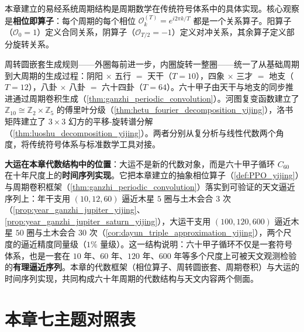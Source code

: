 \begin{remark}[与全书的统一]\label{rem:yijing_book_interface}
本章建立的易经系统周期结构是周期数学在传统符号体系中的具体实现。核心观察是\textbf{相位即算子}：每个周期的每个相位 $\mathcal{O}_k^{(T)} = e^{i2\pi k/T}$ 都是一个关系算子。阳算子（$\mathcal{O}_0 = 1$）定义合同关系，阴算子（$\mathcal{O}_{T/2} = -1$）定义对冲关系，其余算子定义部分旋转关系。

周转圆嵌套生成规则——外圈每前进一步，内圈旋转一整圈——统一了从基础周期到大周期的生成过程：阴阳 $\times$ 五行 $=$ 天干（$T=10$），四象 $\times$ 三才 $=$ 地支（$T=12$），八卦 $\times$ 八卦 $=$ 六十四卦（$T=64$）。六十甲子由天干与地支的同步推进通过周期卷积生成（\cref{thm:ganzhi_periodic_convolution}）。河图复变函数建立了 $\mathbb{Z}_{10} \cong \mathbb{Z}_2 \times \mathbb{Z}_5$ 的傅里叶分级（\cref{thm:hetu_fourier_decomposition_yijing}），洛书矩阵建立了 $3 \times 3$ 幻方的平移-旋转谱分解（\cref{thm:luoshu_decomposition_yijing}）。两者分别从复分析与线性代数两个角度，将传统符号体系与标准数学工具对接。

\textbf{大运在本章代数结构中的位置}：大运不是新的代数对象，而是六十甲子循环 $C_{60}$ 在十年尺度上的\textbf{时间序列实现}。它把本章建立的抽象相位算子（\cref{def:PPO_yijing}）与周期卷积框架（\cref{thm:ganzhi_periodic_convolution}）落实到可验证的天文逼近序列上：年干支用 $(10,12,60)$ 逼近木星 $5$ 圈与土木会合 $3$ 次（\cref{prop:year_ganzhi_jupiter_yijing}、\cref{prop:year_ganzhi_jupiter_saturn_yijing}），大运干支用 $(100,120,600)$ 逼近木星 $50$ 圈与土木会合 $30$ 次（\cref{cor:dayun_triple_approximation_yijing}），两个尺度的逼近精度同量级（$1\%$ 量级）。这一结构说明：六十甲子循环不仅是一套符号体系，也是一套在 $10$ 年、$60$ 年、$120$ 年、$600$ 年等多个尺度上可被天文观测检验的\textbf{有理逼近序列}。本章的代数框架（相位算子、周转圆嵌套、周期卷积）与大运的时间序列实现，共同构成六十年周期的代数结构与天文内容两个侧面。
\end{remark}

\section*{本章七主题对照表}

